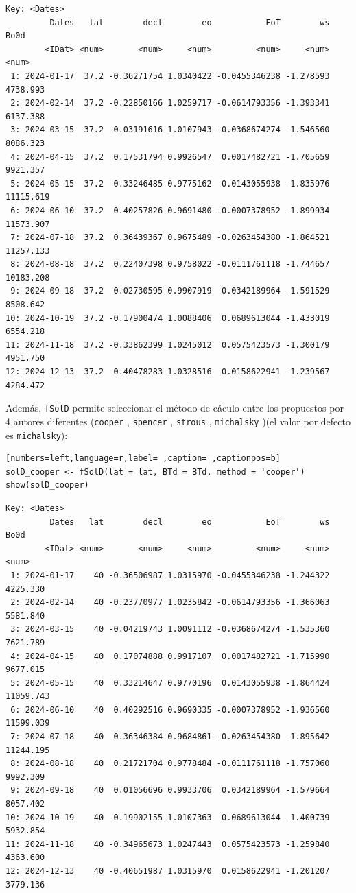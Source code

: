 \begin{verbatim}
Key: <Dates>
         Dates   lat        decl        eo           EoT        ws      Bo0d
        <IDat> <num>       <num>     <num>         <num>     <num>     <num>
 1: 2024-01-17  37.2 -0.36271754 1.0340422 -0.0455346238 -1.278593  4738.993
 2: 2024-02-14  37.2 -0.22850166 1.0259717 -0.0614793356 -1.393341  6137.388
 3: 2024-03-15  37.2 -0.03191616 1.0107943 -0.0368674274 -1.546560  8086.323
 4: 2024-04-15  37.2  0.17531794 0.9926547  0.0017482721 -1.705659  9921.357
 5: 2024-05-15  37.2  0.33246485 0.9775162  0.0143055938 -1.835976 11115.619
 6: 2024-06-10  37.2  0.40257826 0.9691480 -0.0007378952 -1.899934 11573.907
 7: 2024-07-18  37.2  0.36439367 0.9675489 -0.0263454380 -1.864521 11257.133
 8: 2024-08-18  37.2  0.22407398 0.9758022 -0.0111761118 -1.744657 10183.208
 9: 2024-09-18  37.2  0.02730595 0.9907919  0.0342189964 -1.591529  8508.642
10: 2024-10-19  37.2 -0.17900474 1.0088406  0.0689613044 -1.433019  6554.218
11: 2024-11-18  37.2 -0.33862399 1.0245012  0.0575423573 -1.300179  4951.750
12: 2024-12-13  37.2 -0.40478283 1.0328516  0.0158622941 -1.239567  4284.472
\end{verbatim}

Además, \texttt{fSolD} permite seleccionar el método de cáculo entre los propuestos por 4 autores diferentes (\texttt{cooper} \cite{Cooper1969}, \texttt{spencer} \cite{Spencer1971}, \texttt{strous} \cite{Strous2011}, \texttt{michalsky} \cite{Michalsky1988})(el valor por defecto es \texttt{michalsky}):
\begin{lstlisting}[numbers=left,language=r,label= ,caption= ,captionpos=b]
solD_cooper <- fSolD(lat = lat, BTd = BTd, method = 'cooper')
show(solD_cooper)
\end{lstlisting}

\begin{verbatim}
Key: <Dates>
         Dates   lat        decl        eo           EoT        ws      Bo0d
        <IDat> <num>       <num>     <num>         <num>     <num>     <num>
 1: 2024-01-17    40 -0.36506987 1.0315970 -0.0455346238 -1.244322  4225.330
 2: 2024-02-14    40 -0.23770977 1.0235842 -0.0614793356 -1.366063  5581.840
 3: 2024-03-15    40 -0.04219743 1.0091112 -0.0368674274 -1.535360  7621.789
 4: 2024-04-15    40  0.17074888 0.9917107  0.0017482721 -1.715990  9677.015
 5: 2024-05-15    40  0.33214647 0.9770196  0.0143055938 -1.864424 11059.743
 6: 2024-06-10    40  0.40292516 0.9690335 -0.0007378952 -1.936560 11599.039
 7: 2024-07-18    40  0.36346384 0.9684861 -0.0263454380 -1.895642 11244.195
 8: 2024-08-18    40  0.21721704 0.9778484 -0.0111761118 -1.757060  9992.309
 9: 2024-09-18    40  0.01056696 0.9933706  0.0342189964 -1.579664  8057.402
10: 2024-10-19    40 -0.19902155 1.0107363  0.0689613044 -1.400739  5932.854
11: 2024-11-18    40 -0.34965673 1.0247443  0.0575423573 -1.259840  4363.600
12: 2024-12-13    40 -0.40651987 1.0315970  0.0158622941 -1.201207  3779.136
\end{verbatim}

